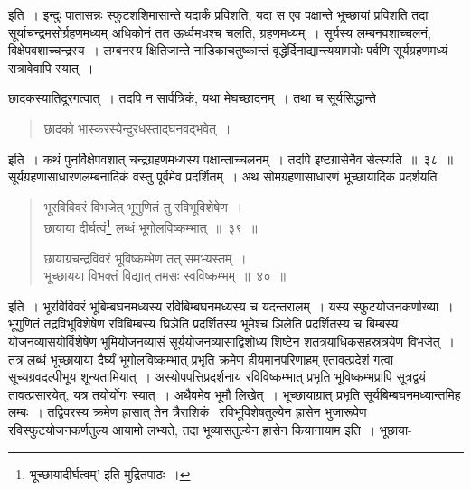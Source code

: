 \documentclass[11pt, openany]{book}
\begin{document}
\indent इति~। इन्दुः पातासन्नः स्फुटशशिमासान्ते यदार्कं प्रविशति, यदा स एव पक्षान्ते भूच्छायां प्रविशति तदा सूर्याचन्द्रमसोर्ग्रहणमध्यम्
अधिकोनं तत ऊर्ध्वमधश्च चलति, ग्रहणमध्यम्~। सूर्यस्य लम्बनवशाच्चलनं, विक्षेपवशाच्चन्द्रस्य~। लम्बनस्य क्षितिजान्ते नाडिकाचतुष्कान्तं
वृद्धेर्दिनाद्यान्त्ययामयोः पर्वणि सूर्यग्रहणमध्यं रात्रावेवापि स्यात्~।

\newpage

\noindent छादकस्यातिदूरगत्वात्~। तदपि न सार्वत्रिकं, यथा मेघच्छादनम्~। तथा च सूर्यसिद्धान्ते\textendash 
	
\begin{quote}
{\qt छादको भास्करस्येन्दुरधस्ताद्घनवद्भवेत्~।}
\end{quote} 

\noindent इति~। कथं पुनर्विक्षेपवशात् चन्द्रग्रहणमध्यस्य पक्षान्ताच्चलनम्~। तदपि इष्टग्रासेनैव सेत्स्यति~॥~३८~॥\\
	
\indent सूर्यग्रहणासाधारणलम्बनादिकं वस्तु पूर्वमेव प्रदर्शितम्~। अथ सोमग्रहणासाधारणं भूच्छायादिकं प्रदर्शयति\textendash 

\begin{quote}
{\ab भूरविविवरं विभजेत् भूगुणितं तु रविभूविशेषेण~।\\
छायाया दीर्घत्वं\renewcommand{\thefootnote}{१}\footnote{भूच्छायादीर्घत्वम्' इति मुद्रितपाठः~।} लब्धं भूगोलविष्कम्भात्~॥~३९~॥
	
छायाग्रचन्द्रविवरं भूविष्कम्भेण तत् समभ्यस्तम्~।\\
भूच्छायया विभक्तं विद्यात् तमसः स्वविष्कम्भम्~॥~४०~॥}
\end{quote}	

\indent इति~। भूरविविवरं भूबिम्बघनमध्यस्य रविबिम्बघनमध्यस्य च यदन्तरालम्~। यस्य स्फुटयोजनकर्णाख्या~। भूगुणितं तद्रविभूविशेषेण
रविबिम्बस्य {\qt घ्रिञे}ति प्रदर्शितस्य भूमेश्च {\qt ञिले}ति प्रदर्शितस्य च बिम्बस्य योजनव्यासयोर्विशेषेण भूमियोजनव्यासं सूर्ययोजनव्यासाद्विशोध्य शिष्टेन शतत्रयाधिकसहस्रत्रयेण विभजेत्~। तत्र लब्धं भूच्छायाया दैर्घ्यं भूगोलविष्कम्भात् प्रभृति क्रमेण हीयमानपरिणाहम् एतावत्प्रदेशं गत्वा सूच्यग्रवदल्पीभूय शून्यतामियात्~। अस्योपपत्तिप्रदर्शनाय रविविष्कम्भात् प्रभृति भूविष्कम्भप्रापि सूत्रद्वयं तावत्प्रसारयेत्, यत्र तयोर्योगः स्यात्~। अथैवमेव भूमौ लिखेत्~। भूच्छायाग्रात् प्रभृति सूर्यबिम्बघनमध्यान्तमिह लम्बः~। तद्विवरस्य क्रमेण ह्रासात् तेन त्रैराशिकं \textendash\ रविभूविशेषतुल्येन ह्रासेन भुजारूपेण रविस्फुटयोजनकर्णतुल्य आयामो लभ्यते, तदा भूव्यासतुल्येन ह्रासेन कियानायाम इति~। भूछाया- 

\newpage
\end{document}
